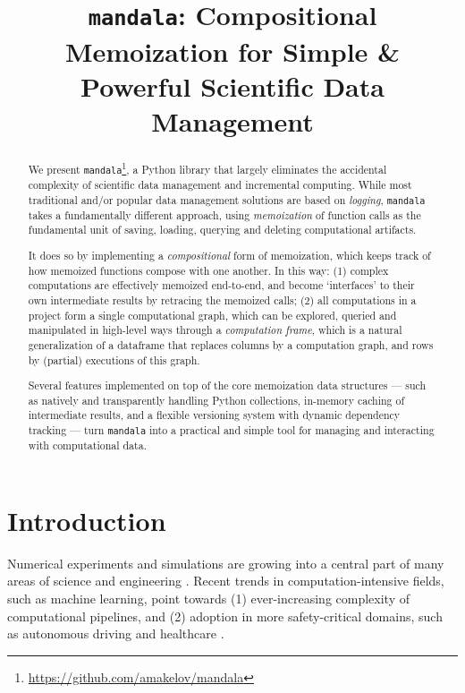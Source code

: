 \documentclass{article} %
\title{\texttt{mandala}: Compositional Memoization for Simple \&
Powerful Scientific Data Management}
\begin{document}
\maketitle


\begin{abstract}
  We present
  \texttt{mandala}\footnote{\url{https://github.com/amakelov/mandala}}, a Python
  library that largely eliminates the accidental complexity of scientific data
  management and incremental computing. While most traditional and/or
  popular data management solutions are based on \emph{logging},
  \texttt{mandala} takes a fundamentally different approach, using
  \emph{memoization} of function calls as the fundamental unit of saving,
  loading, querying and deleting computational artifacts. 
  
  It does so by implementing a \emph{compositional} form of memoization, which keeps
  track of how memoized functions compose with one another. In this way: (1)
  complex computations are effectively memoized end-to-end, and become
  `interfaces' to their own intermediate results by retracing the memoized
  calls; (2) all computations in a project form a single computational graph,
  which can be explored, queried and manipulated in high-level ways through a
  \emph{computation frame}, which is a natural generalization of a dataframe that replaces columns by a computation graph, and rows by (partial) executions of this graph.

  Several features implemented on top of the core memoization data structures ---
  such as natively and transparently handling Python collections, in-memory caching of
  intermediate results, and a flexible versioning system with dynamic dependency
  tracking --- turn \texttt{mandala} into a practical and simple tool for
  managing and interacting with computational data.
\end{abstract}

\section{Introduction}
\label{section:intro}

Numerical experiments and simulations are growing into a central part of many
areas of science and engineering \citep{hey2009fourth}. Recent trends in
computation-intensive fields, such as machine learning, point towards (1)
ever-increasing complexity of computational pipelines, and (2) adoption in more
safety-critical domains, such as autonomous driving \citep{bojarski2016end} and
healthcare \citep{ravi2016deep,abramson2024accurate}.
\end{document}
